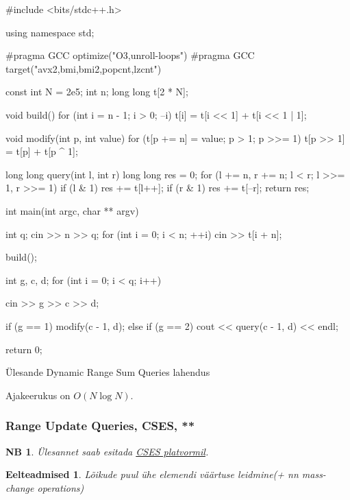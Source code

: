 \documentclass{trkut}
\newtheorem*{prereq}{Eelteadmised}
\newtheorem*{extra}{NB}
\begin{document}
\begin{cclol}
#include <bits/stdc++.h>

using namespace std;

#pragma GCC optimize("O3,unroll-loops")
#pragma GCC target("avx2,bmi,bmi2,popcnt,lzcnt")

const int N = 2e5;
int n;
long long t[2 * N];

void build() {
  for (int i = n - 1; i > 0; --i) t[i] = t[i << 1] + t[i << 1 | 1];
}

void modify(int p, int value) {
  for (t[p += n] = value; p > 1; p >>= 1) t[p >> 1] = t[p] + t[p ^ 1];
}

long long query(int l, int r) {
  long long res = 0;
  for (l += n, r += n; l < r; l >>= 1, r >>= 1) {
    if (l & 1) res += t[l++];
    if (r & 1) res += t[--r];
  }
  return res;
}

int main(int argc, char ** argv) {
  int q;
  cin >> n >> q;
  for (int i = 0; i < n; ++i) cin >> t[i + n];

  build();

  int g, c, d;
  for (int i = 0; i < q; i++) {
    cin >> g >> c >> d;

    if (g == 1) modify(c - 1, d);
    else if (g == 2) cout << query(c - 1, d) << endl;
  }

  return 0;
}
\end{cclol}
 \begin{kk}[H]%
    \caption{Ülesande Dynamic Range Sum Queries lahendus}%
    \label{mkm}%
    \end{kk}

Ajakeerukus on $O(N\log N)$.

\subsubsection{Range Update Queries, CSES, **}
\begin{extra}
Ülesannet saab esitada \href{https://cses.fi/problemset/task/1651}{CSES platvormil}.
\end{extra}
\begin{prereq}
Lõikude puul ühe elemendi väärtuse leidmine(+ nn mass-change operations)
\end{prereq}
\end{document}
